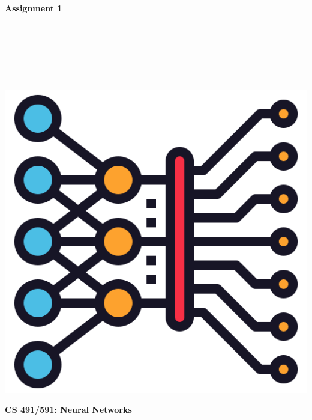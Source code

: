 \documentclass{article}
\begin{document}
\begin{titlepage}
\begin{center}
\vspace*{1cm}
            
\Huge
\textbf{Assignment 1}
            
\vspace{1cm}

\Large
{}

\vspace{2cm}

 \\
 \\
 \\
 \\
 \\

\vspace{2cm}

\includegraphics[scale=0.25]{../figs/icon.png}\\[0.5cm]

\vspace{9cm}

\textbf{CS 491/591: Neural Networks} \\

\end{center}
\end{titlepage}
\end{document}
